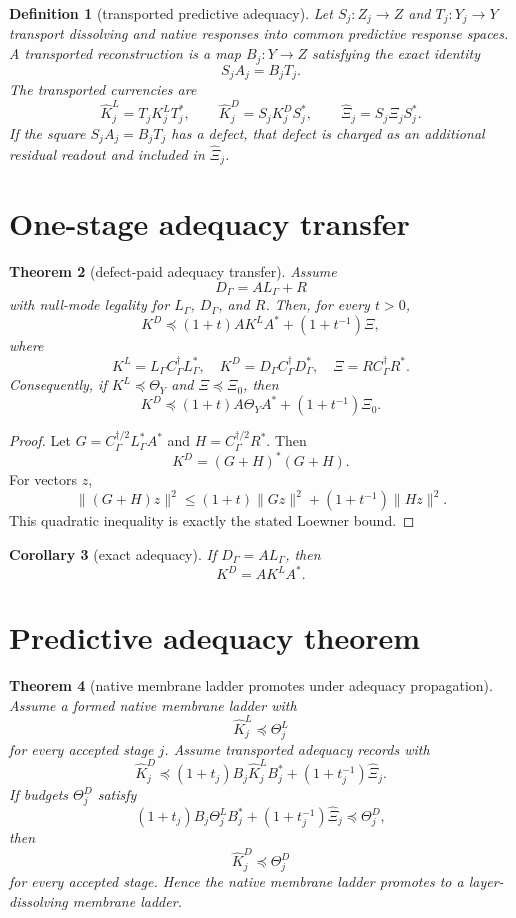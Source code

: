 \documentclass[11pt]{article}
\newtheorem{theorem}{Theorem}[section]
\newtheorem{definition}[theorem]{Definition}
\newtheorem{corollary}[theorem]{Corollary}
\begin{document}
\begin{definition}[transported predictive adequacy]
Let $S_j:Z_j\to Z$ and $T_j:Y_j\to Y$ transport dissolving and native responses into common predictive response spaces. A transported reconstruction is a map $B_j:Y\to Z$ satisfying the exact identity
\[
  S_jA_j=B_jT_j.
\]
The transported currencies are
\[
  \widehat K^L_j=T_jK^L_jT_j^*,
  \qquad
  \widehat K^D_j=S_jK^D_jS_j^*,
  \qquad
  \widehat\Xi_j=S_j\Xi_jS_j^*.
\]
If the square $S_jA_j=B_jT_j$ has a defect, that defect is charged as an additional residual readout and included in $\widehat\Xi_j$.
\end{definition}

\section{One-stage adequacy transfer}

\begin{theorem}[defect-paid adequacy transfer]
Assume
\[
  D_{\Gamma}=AL_{\Gamma}+R
\]
with null-mode legality for $L_{\Gamma}$, $D_{\Gamma}$, and $R$. Then, for every $t>0$,
\[
  K^D \preceq (1+t)AK^LA^*+(1+t^{-1})\Xi,
\]
where
\[
  K^L=L_{\Gamma}C_{\Gamma}^{\dagger}L_{\Gamma}^*,
  \quad
  K^D=D_{\Gamma}C_{\Gamma}^{\dagger}D_{\Gamma}^*,
  \quad
  \Xi=RC_{\Gamma}^{\dagger}R^*.
\]
Consequently, if $K^L\preceq\Theta_Y$ and $\Xi\preceq\Xi_0$, then
\[
  K^D \preceq (1+t)A\Theta_YA^*+(1+t^{-1})\Xi_0.
\]
\end{theorem}

\begin{proof}
Let $G=C_{\Gamma}^{\dagger/2}L_{\Gamma}^*A^*$ and $H=C_{\Gamma}^{\dagger/2}R^*$. Then
\[
  K^D=(G+H)^*(G+H).
\]
For vectors $z$,
\[
  \|(G+H)z\|^2\le (1+t)\|Gz\|^2+(1+t^{-1})\|Hz\|^2.
\]
This quadratic inequality is exactly the stated Loewner bound.
\end{proof}

\begin{corollary}[exact adequacy]
If $D_{\Gamma}=AL_{\Gamma}$, then
\[
  K^D=AK^LA^*.
\]
\end{corollary}

\section{Predictive adequacy theorem}

\begin{theorem}[native membrane ladder promotes under adequacy propagation]
Assume a formed native membrane ladder with
\[
  \widehat K^L_j\preceq \Theta^L_j
\]
for every accepted stage $j$. Assume transported adequacy records with
\[
  \widehat K^D_j \preceq (1+t_j)B_j\widehat K^L_jB_j^*+(1+t_j^{-1})\widehat\Xi_j.
\]
If budgets $\Theta^D_j$ satisfy
\[
  (1+t_j)B_j\Theta^L_jB_j^*+(1+t_j^{-1})\widehat\Xi_j\preceq\Theta^D_j,
\]
then
\[
  \widehat K^D_j\preceq\Theta^D_j
\]
for every accepted stage. Hence the native membrane ladder promotes to a layer-dissolving membrane ladder.
\end{theorem}
\end{document}
